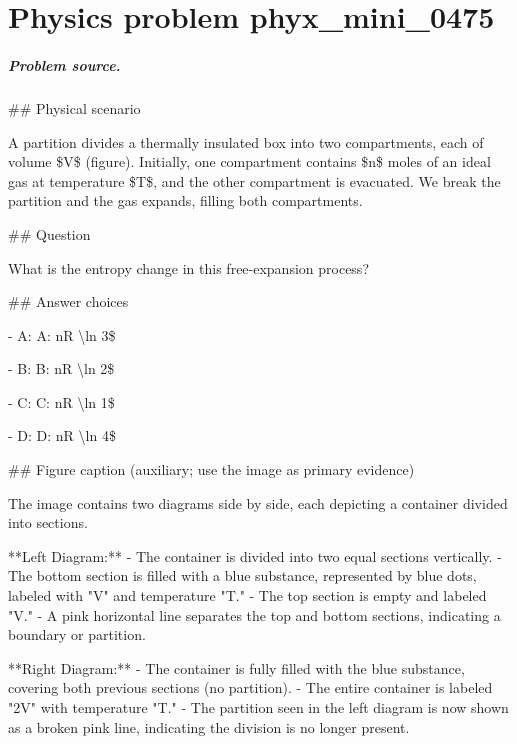 
\chapter{Physics problem phyx\_mini\_0475}
\label{ch:PhyXMiniProblems_problem_phyx_mini_0475}

\paragraph{Problem source.}
\#\# Physical scenario

A partition divides a thermally insulated box into two compartments, each of volume \$V\$ (figure). Initially, one compartment contains \$n\$ moles of an ideal gas at temperature \$T\$, and the other compartment is evacuated. We break the partition and the gas expands, filling both compartments.

\#\# Question

What is the entropy change in this free-expansion process?

\#\# Answer choices

- A: A: nR \textbackslash{}ln 3\$

- B: B: nR \textbackslash{}ln 2\$

- C: C: nR \textbackslash{}ln 1\$

- D: D: nR \textbackslash{}ln 4\$

\#\# Figure caption (auxiliary; use the image as primary evidence)

The image contains two diagrams side by side, each depicting a container divided into sections.

**Left Diagram:**
- The container is divided into two equal sections vertically.
- The bottom section is filled with a blue substance, represented by blue dots, labeled with "V" and temperature "T."
- The top section is empty and labeled "V."
- A pink horizontal line separates the top and bottom sections, indicating a boundary or partition.

**Right Diagram:**
- The container is fully filled with the blue substance, covering both previous sections (no partition).
- The entire container is labeled "2V" with temperature "T."
- The partition seen in the left diagram is now shown as a broken pink line, indicating the division is no longer present.

